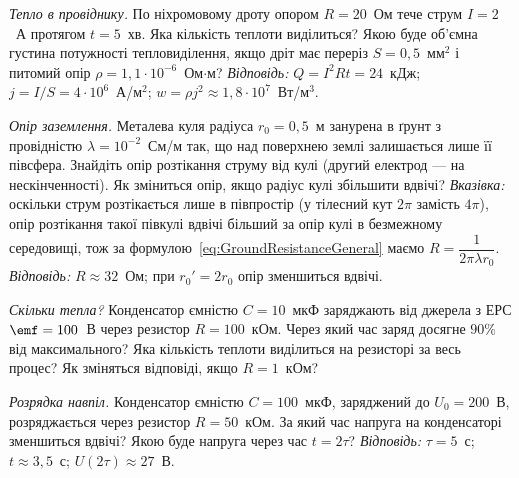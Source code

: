 \begin{problem}\label{prb:JouleLenz}
	\emph{Тепло в провіднику.} По ніхромовому дроту опором $R=20$~Ом тече струм $I=2$~А протягом $t=5$~хв. Яка кількість теплоти
	виділиться? Якою буде об'ємна густина потужності тепловиділення, якщо дріт має переріз $S=0{,}5$~мм$^2$ і питомий опір
	$\rho=1{,}1\cdot10^{-6}$~Ом$\cdot$м?
	\emph{Відповідь:} $Q=I^2Rt=24$~кДж; $j=I/S=4\cdot10^{6}$~А/м$^2$; $w=\rho j^2\approx1{,}8\cdot10^{7}$~Вт/м$^3$.
\end{problem}

\begin{problem}\label{prb:GroundResistanceSphere}
	\emph{Опір заземлення.} Металева куля радіуса $r_0=0{,}5$~м занурена в ґрунт з провідністю $\lambda=10^{-2}$~См/м так, що над
	поверхнею землі залишається лише її півсфера. Знайдіть опір розтікання струму від кулі (другий електрод — на нескінченності).
	Як зміниться опір, якщо радіус кулі збільшити вдвічі?
	\emph{Вказівка:} оскільки струм розтікається лише в півпростір (у тілесний кут $2\pi$ замість $4\pi$), опір розтікання такої півкулі вдвічі більший за опір кулі в безмежному середовищі, тож за формулою~\eqref{eq:GroundResistanceGeneral} маємо $R=\dfrac{1}{2\pi\lambda r_0}$.
	\emph{Відповідь:} $R\approx32$~Ом; при $r_0'=2r_0$ опір зменшиться вдвічі.
\end{problem}


\begin{problem}\label{prb:RCChargeHeat}
	\emph{Скільки тепла?} Конденсатор ємністю $C=10$~мкФ заряджають від джерела з ЕРС $\emf=100$~В через резистор $R=100$~кОм. Через який
	час заряд досягне $90\%$ від максимального? Яка кількість теплоти виділиться на резисторі за весь процес? Як зміняться відповіді, якщо
	$R=1$~кОм?
\end{problem}

\begin{problem}\label{prb:RCDischargeHalf}
	\emph{Розрядка навпіл.} Конденсатор ємністю $C=100$~мкФ, заряджений до $U_0=200$~В, розряджається через резистор $R=50$~кОм.
	За який час напруга на конденсаторі зменшиться вдвічі? Якою буде напруга через час $t=2\tau$?
	\emph{Відповідь:} $\tau=5$~с; $t\approx3{,}5$~с; $U(2\tau)\approx27$~В.
\end{problem}


